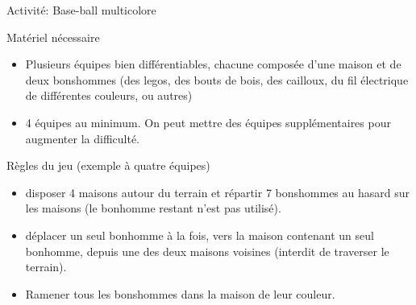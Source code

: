 %

\begin{frame}{Activité: Base-ball multicolore}
  \begin{block}{Matériel nécessaire}
    \begin{itemize}
    \item Plusieurs équipes bien différentiables, chacune composée d'une maison et de deux bonshommes (des legos, des bouts de bois, des cailloux, du fil électrique de différentes couleurs, ou autres) 
    \item 4 équipes au minimum. On peut mettre des équipes supplémentaires pour augmenter la difficulté.
    \end{itemize}
  \end{block}

  \begin{block}{Règles du jeu (exemple à quatre équipes)}
    \begin{itemize}
      \item {} disposer 4 maisons autour du terrain et répartir 7 bonshommes au hasard sur les maisons (le bonhomme restant n'est pas utilisé).
      \item {} déplacer un seul bonhomme à la fois, vers la maison contenant un seul bonhomme, depuis une des deux maisons voisines (interdit de traverser le terrain).
    \item  {} Ramener tous les bonshommes dans la maison de leur couleur.
    \end{itemize}
  \end{block}

  \bigskip


\end{frame}
